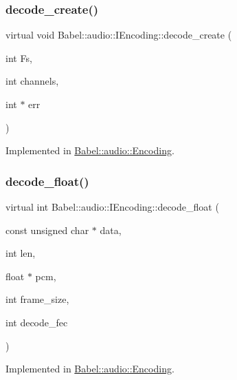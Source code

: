 \subsubsection{\texorpdfstring{decode\+\_\+create()}{decode\_create()}}
{\footnotesize\ttfamily virtual void Babel\+::audio\+::\+I\+Encoding\+::decode\+\_\+create (\begin{DoxyParamCaption}\item[{int}]{Fs,  }\item[{int}]{channels,  }\item[{int $\ast$}]{err }\end{DoxyParamCaption})\hspace{0.3cm}{\ttfamily [pure virtual]}}



Implemented in \hyperlink{classBabel_1_1audio_1_1Encoding_add816037f2047989da7e72ebad6d7ab1}{Babel\+::audio\+::\+Encoding}.

\mbox{\label{classBabel_1_1audio_1_1IEncoding_a3624d08fb33522dde6118f32ce84d2ed}} 
\subsubsection{\texorpdfstring{decode\+\_\+float()}{decode\_float()}}
{\footnotesize\ttfamily virtual int Babel\+::audio\+::\+I\+Encoding\+::decode\+\_\+float (\begin{DoxyParamCaption}\item[{const unsigned char $\ast$}]{data,  }\item[{int}]{len,  }\item[{float $\ast$}]{pcm,  }\item[{int}]{frame\+\_\+size,  }\item[{int}]{decode\+\_\+fec }\end{DoxyParamCaption})\hspace{0.3cm}{\ttfamily [pure virtual]}}



Implemented in \hyperlink{classBabel_1_1audio_1_1Encoding_aaeab672c025f3859ba695726d6c27353}{Babel\+::audio\+::\+Encoding}.

\mbox{\label{classBabel_1_1audio_1_1IEncoding_a2338b60bd05e7c93f3c03963558071e2}} 
